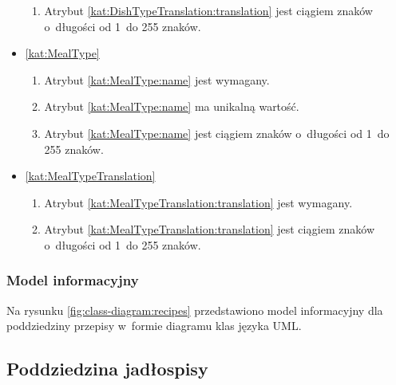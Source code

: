 \begin{itemize}[label={\textbf{Ograniczenia dla}}, wide, labelwidth=!, labelindent=0pt]
\begin{enumerate}[label={\textbf{OGR/3/\protect\twodigits{\arabic{enumi}}}}, wide, labelwidth=!, align=left, leftmargin=3cm, resume]
        \item Atrybut \ref{kat:DishTypeTranslation:translation} jest ciągiem znaków o~długości od 1~do 255 znaków.
    \end{enumerate}

    \item\ref{kat:MealType}\mynobreakpar
    \begin{enumerate}[label={\textbf{OGR/3/\protect\twodigits{\arabic{enumi}}}}, wide, labelwidth=!, align=left, leftmargin=3cm, resume]
        \item Atrybut \ref{kat:MealType:name} jest wymagany.

        \item Atrybut \ref{kat:MealType:name} ma unikalną wartość.

        \item Atrybut \ref{kat:MealType:name} jest ciągiem znaków o~długości od 1~do 255 znaków.
    \end{enumerate}

    \item\ref{kat:MealTypeTranslation}\mynobreakpar
    \begin{enumerate}[label={\textbf{OGR/3/\protect\twodigits{\arabic{enumi}}}}, wide, labelwidth=!, align=left, leftmargin=3cm, resume]
        \item Atrybut \ref{kat:MealTypeTranslation:translation} jest wymagany.

        \item Atrybut \ref{kat:MealTypeTranslation:translation} jest ciągiem znaków o~długości od 1~do 255 znaków.
    \end{enumerate}
\end{itemize}

\subsubsection{Model informacyjny}\label{subsubsec:database:recipes:domainModel}

Na rysunku \ref{fig:class-diagram:recipes} przedstawiono model informacyjny dla poddziedziny przepisy w~formie diagramu klas języka UML.


\subsection{Poddziedzina jadłospisy}\label{subsec:database:mealplans}

